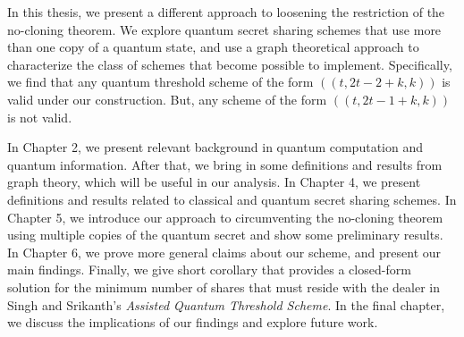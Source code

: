 In this thesis, we present a different approach to loosening the restriction of the no-cloning theorem. We explore quantum secret sharing schemes that use more than one copy of a quantum state, and use a graph theoretical approach to characterize the class of schemes that become possible to implement. Specifically, we find that any quantum threshold scheme of the form $((t,2t-2+k,k))$ is valid under our construction. But, any scheme of the form $((t,2t-1+k,k))$ is not valid.

In Chapter 2, we present relevant background in quantum computation and quantum information. After that, we bring in some definitions and results from graph theory, which will be useful in our analysis. In Chapter 4, we present definitions and results related to classical and quantum secret sharing schemes. In Chapter 5, we introduce our approach to circumventing the no-cloning theorem using multiple copies of the quantum secret and show some preliminary results. In Chapter 6, we prove more general claims about our scheme, and present our main findings. Finally, we give short corollary that provides a closed-form solution for the minimum number of shares that must reside with the dealer in Singh and Srikanth's \textit{Assisted Quantum Threshold Scheme}. In the final chapter, we discuss the implications of our findings and explore future work.